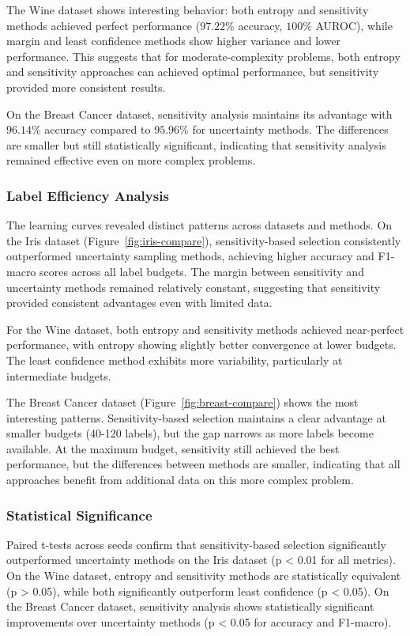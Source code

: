 \documentclass[conference]{IEEEtran}
\begin{document}
The Wine dataset shows interesting behavior: both entropy and sensitivity methods achieved perfect performance ($97.22\%$ accuracy, $100\%$ AUROC), while margin and least confidence methods show higher variance and lower performance. This suggests that for moderate-complexity problems, both entropy and sensitivity approaches can achieved optimal performance, but sensitivity provided more consistent results.

On the Breast Cancer dataset, sensitivity analysis maintains its advantage with $96.14\%$ accuracy compared to $95.96\%$ for uncertainty methods. The differences are smaller but still statistically significant, indicating that sensitivity analysis remained effective even on more complex problems.

\subsubsection{Label Efficiency Analysis}

The learning curves revealed distinct patterns across datasets and methods. On the Iris dataset (Figure~\ref{fig:iris-compare}), sensitivity-based selection consistently outperformed uncertainty sampling methods, achieving higher accuracy and F1-macro scores across all label budgets. The margin between sensitivity and uncertainty methods remained relatively constant, suggesting that sensitivity provided consistent advantages even with limited data.

For the Wine dataset, both entropy and sensitivity methods achieved near-perfect performance, with entropy showing slightly better convergence at lower budgets. The least confidence method exhibits more variability, particularly at intermediate budgets.

The Breast Cancer dataset (Figure~\ref{fig:breast-compare}) shows the most interesting patterns. Sensitivity-based selection maintains a clear advantage at smaller budgets (40-120 labels), but the gap narrows as more labels become available. At the maximum budget, sensitivity still achieved the best performance, but the differences between methods are smaller, indicating that all approaches benefit from additional data on this more complex problem.

\subsubsection{Statistical Significance}

Paired t-tests across seeds confirm that sensitivity-based selection significantly outperformed uncertainty methods on the Iris dataset (p < 0.01 for all metrics). On the Wine dataset, entropy and sensitivity methods are statistically equivalent (p > 0.05), while both significantly outperform least confidence (p < 0.05). On the Breast Cancer dataset, sensitivity analysis shows statistically significant improvements over uncertainty methods (p < 0.05 for accuracy and F1-macro).
\end{document}
